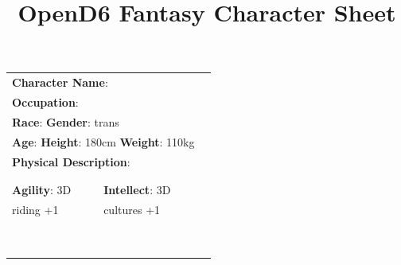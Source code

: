 \documentclass[10pt]{article}
\title{OpenD6 Fantasy Character Sheet}
\begin{document}
\pagestyle{fancy}
\fancyhf{}
\fancyfoot[R]{\thepage}
\renewcommand{\headrulewidth}{0pt}


\cleardoublepage
\begin{table}
\begin{tabular}{m{156pt} m{156pt} m{156pt}}
    \multicolumn{2}{l}{\textbf{Character Name}:  \hrulefill} \\
    \multicolumn{2}{l}{\textbf{Occupation}:  \hrulefill} \\
    \multicolumn{2}{l}{\textbf{Race}:  \hrulefill \hspace{1em} \textbf{Gender}: trans \hrulefill} \\
    \multicolumn{2}{l}{\textbf{Age}:  \hrulefill \hspace{1em} \textbf{Height}: 180cm \hrulefill \hspace{1em}  \textbf{Weight}: 110kg \hrulefill } \\
    \multicolumn{2}{l}{\textbf{Physical Description}:  \hrulefill } \\
    \multicolumn{2}{l}{ \hrulefill } \\
 & & \\
\textbf{Agility}: 3D \hrulefill      & \textbf{Intellect}: 3D \hrulefill  &                             \\

riding            +1 \hrulefill & cultures          +1 \hrulefill & \\

 \hrulefill &  \hrulefill & \\

 \hrulefill &  \hrulefill & \\

 \hrulefill &  \hrulefill & \\

 \hrulefill &  \hrulefill & \\

 \hrulefill &  \hrulefill & \\

 \hrulefill &  \hrulefill & \\

 \hrulefill &  \hrulefill & \\

 \hrulefill &  \hrulefill & \\

 \hrulefill &  \hrulefill & \\


\end{tabular}
\end{table}
\end{document}
